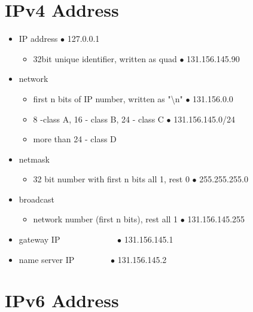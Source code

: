 \documentclass{report}
\begin{document}
\section{IPv4 Address}
\begin{itemize}
  \item IP address \hspace{5mm} $\bullet$ 127.0.0.1
    \begin{itemize}[label=$\circ$] 
      \item 32bit unique identifier, written as quad \hspace{5mm} $\bullet$ 131.156.145.90
      \end{itemize}
      \item network
        \begin{itemize}[label=$\circ$]
          \item first n bits of IP number, written as "\textbackslash n" \hspace{5mm}$\bullet$ 131.156.0.0
          \item 8 -class A, 16 - class B, 24 - class C \hspace{5mm} $\bullet$ 131.156.145.0/24
          \item more than 24 - class D
        \end{itemize}
      \item netmask
        \begin{itemize}[label=$\circ$]
          \item 32 bit number with first n bits all 1, rest 0 \hspace{5mm} $\bullet$ 255.255.255.0
        \end{itemize}
      \item broadcast
        \begin{itemize}[label=$\circ$]
          \item network number (first n bits), rest all 1  \hspace{5mm} $\bullet$ 131.156.145.255
        \end{itemize}
        \bigbreak \noindent
      \item gateway IP  \ \ \  \ \ \ \ \ \ \ \ \ \ $\bullet$ 131.156.145.1
      \item name server IP \ \ \ \ \ \ \ \ $\bullet$ 131.156.145.2
\end{itemize}
\section{IPv6 Address}
\end{document}
